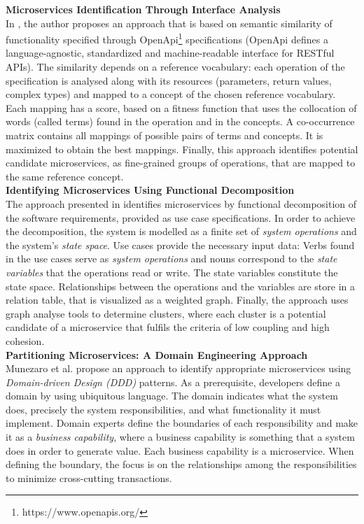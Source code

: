 \noindent
\textbf{Microservices Identification Through Interface Analysis   } \\
In \cite{interfaceAnalysisBaresi}, the author proposes an approach that is based on semantic similarity of functionality specified through OpenApi\footnote{https://www.openapis.org/} specifications (OpenApi defines a language-agnostic, standardized and machine-readable interface for RESTful APIs). The similarity depends on a reference vocabulary: each operation of the specification is analysed along with its resources (parameters, return values, complex types) and mapped to a concept of the chosen reference vocabulary. Each mapping has a score, based on a fitness function that uses the collocation of words (called terms) found in the operation and in the concepts. A co-occurrence matrix contains all mappings of possible pairs of terms and concepts. It is maximized to obtain the best mappings. Finally, this approach identifies potential candidate microservices, as fine-grained groups of operations, that are mapped to the same reference concept. \\


\noindent
\textbf{Identifying Microservices Using Functional Decomposition  } \\
The approach presented in \cite{FunctionalDecompositionHeinrich} identifies microservices by functional decomposition of the software requirements, provided as use case specifications. In order to achieve the decomposition, the system is  modelled as a finite set of \textit{system operations} and the system's \textit{state space}. Use cases provide the necessary input data: Verbs found in the use cases serve as \textit{system operations} and nouns correspond to the \textit{state variables} that the operations read or write. The state variables constitute the state space. Relationships between the operations and the variables are store in a relation table, that is visualized as a weighted graph. Finally, the approach uses graph analyse tools to determine clusters, where each cluster is a potential candidate of a microservice that fulfils the criteria of low coupling and high cohesion. \\



\noindent
\textbf{Partitioning Microservices: A Domain Engineering Approach } \\
Munezaro et al. \cite{DomainEngineeringMunezero} propose an approach to identify appropriate microservices using \textit{Domain-driven Design (DDD)} patterns. As a prerequisite, developers define a domain by using ubiquitous language. The domain indicates what the system does, precisely the system responsibilities, and what functionality it must implement. Domain experts define the boundaries of each responsibility and make it as a \textit{business capability}, where a business capability is something that a system does in order to generate value. Each business capability is a microservice. When defining the boundary, the focus is on the relationships among the responsibilities to minimize cross-cutting transactions. \\

